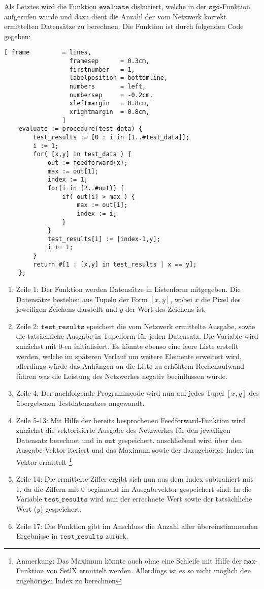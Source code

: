\noindent
Als Letztes wird die Funktion $\mathtt{evaluate}$ diskutiert, welche in der $\mathtt{sgd}$-Funktion aufgerufen wurde und dazu dient die Anzahl der vom Netzwerk korrekt ermittelten Datensätze zu berechnen. Die Funktion ist durch folgenden Code gegeben:
\begin{Verbatim}[ frame         = lines, 
                  framesep      = 0.3cm, 
                  firstnumber   = 1,
                  labelposition = bottomline,
                  numbers       = left,
                  numbersep     = -0.2cm,
                  xleftmargin   = 0.8cm,
                  xrightmargin  = 0.8cm,
                ]
    evaluate := procedure(test_data) {
        test_results := [0 : i in [1..#test_data]];	
        i := 1;
        for( [x,y] in test_data ) {
            out := feedforward(x);
            max := out[1];
            index := 1;
            for(i in {2..#out}) {
                if( out[i] > max ) {
                    max := out[i];
                    index := i;
                }
            }
            test_results[i] := [index-1,y];
            i += 1;
        }	
        return #[1 : [x,y] in test_results | x == y];
    };
\end{Verbatim}
\begin{enumerate}
\item Zeile 1: Der Funktion werden Datensätze in Listenform mitgegeben. Die Datensätze bestehen aus Tupeln der Form $[x,y]$, wobei $x$ die Pixel des jeweiligen Zeichens darstellt und $y$ der Wert des Zeichens ist.
\item Zeile 2: $\mathtt{test\_results}$ speichert die vom Netzwerk ermittelte Ausgabe, sowie die tatsächliche Ausgabe in Tupelform für jeden Datensatz. Die Variable wird zunächst mit 0-en initialisiert. Es könnte ebenso eine leere Liste erstellt werden, welche im späteren Verlauf um weitere Elemente erweitert wird, allerdings würde das Anhängen an die Liste zu erhöhtem Rechenaufwand führen was die Leistung des Netzwerkes negativ beeinflussen würde.
\item Zeile 4: Der nachfolgende Programmcode wird nun auf jedes Tupel $[x,y]$ des übergebenen Testdatensatzes angewandt.
\item Zeile 5-13: Mit Hilfe der bereits besprochenen Feedforward-Funktion wird zunächst die vektorisierte Ausgabe des Netzwerkes für den jeweiligen Datensatz berechnet und in $\mathtt{out}$ gespeichert. anschließend wird über den Ausgabe-Vektor iteriert und das Maximum sowie der dazugehörige Index im Vektor ermittelt \footnote{Anmerkung: Das Maximum könnte auch ohne eine Schleife mit Hilfe der $\mathtt{max}$-Funktion von SetlX ermittelt werden. Allerdings ist es so nicht möglich den zugehörigen Index zu berechnen}. 
\item Zeile 14: Die ermittelte Ziffer ergibt sich nun aus dem Index subtrahiert mit 1, da die Ziffern mit 0 beginnend im Ausgabevektor gespeichert sind. In die Variable $\mathtt{test\_results}$ wird nun der errechnete Wert sowie der tatsächliche Wert ($y$) gespeichert.
\item Zeile 17: Die Funktion gibt im Anschluss die Anzahl aller übereinstimmenden Ergebnisse in $\mathtt{test\_results}$ zurück.
\end{enumerate}

